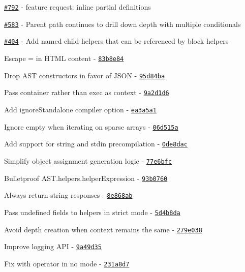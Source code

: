 \begin{DoxyItemize}
\item \href{https://github.com/wycats/handlebars.js/issues/792}{\tt \#792} -\/ feature request\+: inline partial definitions
\item \href{https://github.com/wycats/handlebars.js/issues/583}{\tt \#583} -\/ Parent path continues to drill down depth with multiple conditionals
\item \href{https://github.com/wycats/handlebars.js/issues/404}{\tt \#404} -\/ Add named child helpers that can be referenced by block helpers
\item Escape = in H\+T\+ML content -\/ \href{https://github.com/wycats/handlebars.js/commit/83b8e84}{\tt 83b8e84}
\item Drop A\+ST constructors in favor of J\+S\+ON -\/ \href{https://github.com/wycats/handlebars.js/commit/95d84ba}{\tt 95d84ba}
\item Pass container rather than exec as context -\/ \href{https://github.com/wycats/handlebars.js/commit/9a2d1d6}{\tt 9a2d1d6}
\item Add ignore\+Standalone compiler option -\/ \href{https://github.com/wycats/handlebars.js/commit/ea3a5a1}{\tt ea3a5a1}
\item Ignore empty when iterating on sparse arrays -\/ \href{https://github.com/wycats/handlebars.js/commit/06d515a}{\tt 06d515a}
\item Add support for string and stdin precompilation -\/ \href{https://github.com/wycats/handlebars.js/commit/0de8dac}{\tt 0de8dac}
\item Simplify object assignment generation logic -\/ \href{https://github.com/wycats/handlebars.js/commit/77e6bfc}{\tt 77e6bfc}
\item Bulletproof A\+S\+T.\+helpers.\+helper\+Expression -\/ \href{https://github.com/wycats/handlebars.js/commit/93b0760}{\tt 93b0760}
\item Always return string responses -\/ \href{https://github.com/wycats/handlebars.js/commit/8e868ab}{\tt 8e868ab}
\item Pass undefined fields to helpers in strict mode -\/ \href{https://github.com/wycats/handlebars.js/commit/5d4b8da}{\tt 5d4b8da}
\item Avoid depth creation when context remains the same -\/ \href{https://github.com/wycats/handlebars.js/commit/279e038}{\tt 279e038}
\item Improve logging A\+PI -\/ \href{https://github.com/wycats/handlebars.js/commit/9a49d35}{\tt 9a49d35}
\item Fix with operator in no  mode -\/ \href{https://github.com/wycats/handlebars.js/commit/231a8d7}{\tt 231a8d7}

\end{DoxyItemize}
